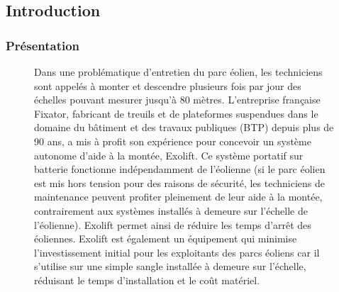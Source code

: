 \ifprof
\else

\subsection{Introduction}
\subsubsection{Présentation}

\begin{figure}[!htb]
\begin{minipage}{0.5\textwidth}
Dans une problématique d'entretien du parc éolien, les techniciens sont appelés à monter et descendre plusieurs fois par jour des échelles pouvant mesurer jusqu'à 80 mètres. L'entreprise française Fixator, fabricant de treuils et de plateformes suspendues dans le domaine du bâtiment et des travaux publiques (BTP) depuis plus de 90 ans, a mis à profit son expérience pour concevoir un système autonome d'aide à la montée, Exolift. Ce système portatif sur batterie fonctionne indépendamment de l'éolienne (si le parc éolien est mis hors tension pour des raisons de sécurité, les techniciens de maintenance peuvent profiter pleinement de leur aide à la montée, contrairement aux systèmes installés à demeure sur l'échelle de l'éolienne). Exolift permet ainsi de réduire les temps d'arrêt des éoliennes. Exolift est également un équipement qui minimise l'investissement initial pour les exploitants des parcs éoliens car il s'utilise sur une simple sangle installée à demeure sur l'échelle, réduisant le temps d'installation et le coût matériel.
\end{minipage}
\begin{minipage}{0.5\textwidth}
\begin{center}

\end{center}
\end{minipage}
\end{figure}
